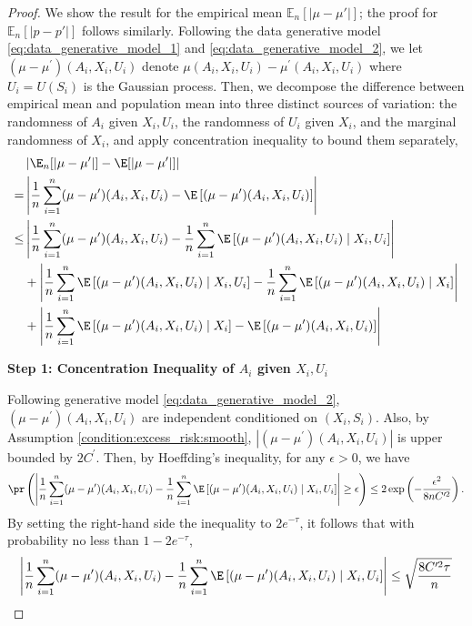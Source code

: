 \begin{proof}
We show the result for the empirical mean $\mathbb{E}_n[|\mu - \mu'|]$; the proof for $\mathbb{E}_n[|p - p'|]$ follows similarly. Following the data generative model \eqref{eq:data_generative_model_1} and \eqref{eq:data_generative_model_2}, we let $(\mu - \mu^\prime)(A_i,X_i,U_i)$ denote $\mu(A_i,X_i,U_i)-\mu^\prime(A_i,X_i,U_i)$ where $U_i =U(S_i)$ is the Gaussian process. Then, we decompose the difference between empirical mean and population mean into three distinct sources of variation: the randomness of $A_i$ given $X_i,U_i$, the randomness of $U_i$ given $X_i$, and the marginal randomness of $X_i$, and apply concentration inequality to bound them separately, 
\begin{align*}
    &\left|\E_n[|\mu-\mu^\prime|]-\E[|\mu-\mu^\prime|]\right|\\
    = & \left|\frac{1}{n}\sum_{i=1}^n(\mu - \mu^\prime)(A_i,X_i,U_i) - \E\left[(\mu - \mu^\prime)(A_i,X_i,U_i)\right]\right|\\
    \leq & \left|\frac{1}{n}\sum_{i=1}^n(\mu - \mu^\prime)(A_i,X_i,U_i) - \frac{1}{n}\sum_{i=1}^n\E\left[(\mu - \mu^\prime)(A_i,X_i,U_i)\mid X_i,U_i\right]\right|\\
    & + \left|\frac{1}{n}\sum_{i=1}^n\E\left[(\mu - \mu^\prime)(A_i,X_i,U_i)\mid X_i,U_i\right] - \frac{1}{n}\sum_{i=1}^n\E\left[(\mu - \mu^\prime)(A_i,X_i,U_i)\mid X_i\right]\right|\\
    & + \left|\frac{1}{n}\sum_{i=1}^n\E\left[(\mu - \mu^\prime)(A_i,X_i,U_i)\mid X_i\right] - \E\left[(\mu - \mu^\prime)(A_i,X_i,U_i)\right]\right|
\end{align*}

\noindent\textbf{Step 1: Concentration Inequality of $A_i$ given $X_i,U_i$}

\noindent Following generative model \eqref{eq:data_generative_model_2}, 
$(\mu - \mu^\prime)(A_i,X_i,U_i)$ are independent conditioned on $(X_i,S_i)$. Also, by Assumption \ref{condition:excess_risk:smooth}, $|(\mu - \mu^\prime)(A_i,X_i,U_i)|$ is upper bounded by $2C^\prime$. Then, by Hoeffding's inequality, for any $\epsilon>0$, we have 
$$\pr\left(\left|\frac{1}{n}\sum_{i=1}^n(\mu - \mu^\prime)(A_i,X_i,U_i) - \frac{1}{n}\sum_{i=1}^n\E\left[(\mu - \mu^\prime)(A_i,X_i,U_i)\mid X_i,U_i\right]\right|\geq \epsilon\right)\leq 2\exp\left(-\frac{\epsilon^2}{8nC^{\prime2}}\right).$$
By setting the right-hand side the inequality to $2e^{-\tau}$, it follows that with probability no less than $1-2e^{-\tau}$,
$$\left|\frac{1}{n}\sum_{i=1}^n(\mu - \mu^\prime)(A_i,X_i,U_i) - \frac{1}{n}\sum_{i=1}^n\E\left[(\mu - \mu^\prime)(A_i,X_i,U_i)\mid X_i,U_i\right]\right|\leq \sqrt{\frac{8C^{\prime2}\tau}{n}} $$


\end{proof}
